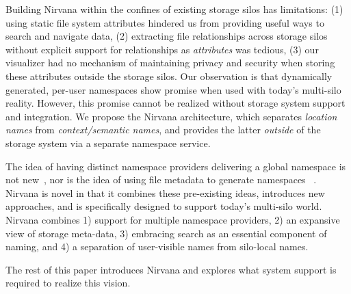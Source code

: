 Building Nirvana within the confines of existing storage silos has limitations:
(1) using static file system attributes hindered us from providing useful ways to search and navigate data, 
(2) extracting file relationships across storage silos without explicit support for relationships as \textit{attributes} was tedious, 
(3) our visualizer had no mechanism of maintaining privacy and security when storing these attributes outside the storage silos. 
Our observation is that dynamically generated, per-user namespaces show promise when used with today's multi-silo reality. 
However, this promise cannot be realized without storage system support and integration.
We propose the Nirvana architecture, which separates \textit{location names} from \textit{context/semantic names}, and provides 
the latter \textit{outside} of the storage system via a separate namespace service.

The idea of having distinct namespace providers delivering a global namespace is not new~\cite{howard1988scale,kazar1990decorum}, 
nor is the idea of using file metadata to generate namespaces ~\cite{gifford1991semantic}.
Nirvana is novel in that it combines these pre-existing ideas, introduces new approaches, and is specifically designed to support today's multi-silo world.
Nirvana combines 1) support for multiple namespace providers, 
2) an expansive view of storage meta-data, 
3) embracing search as an essential component of naming, and 
4) a separation of user-visible names from silo-local names.

The rest of this paper introduces Nirvana and explores what system support is required to realize this vision.









